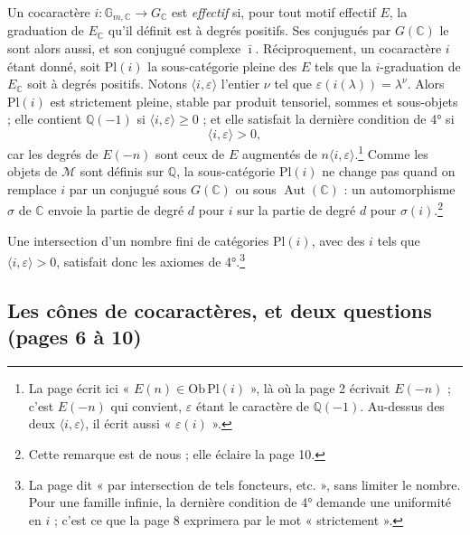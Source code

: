 \documentclass[11pt,a4paper]{article}
\begin{document}
Un cocaractère $i \colon \mathbb{G}_{m,\mathbb{C}} \to G_{\mathbb{C}}$ est
\emph{effectif} si, pour tout motif effectif $E$, la graduation de
$E_{\mathbb{C}}$ qu'il définit est à degrés positifs. Ses conjugués par
$G(\mathbb{C})$ le sont alors aussi, et son conjugué complexe $\bar{\imath}$.
Réciproquement, un cocaractère $i$ étant donné, soit $\mathrm{Pl}(i)$ la
sous-catégorie pleine des $E$ tels que la $i$-graduation de $E_{\mathbb{C}}$
soit à degrés positifs. Notons $\langle i, \varepsilon\rangle$ l'entier $\nu$
tel que $\varepsilon(i(\lambda)) = \lambda^{\nu}$. Alors $\mathrm{Pl}(i)$ est
strictement pleine, stable par produit tensoriel, sommes et sous-objets ; elle
contient $\mathbb{Q}(-1)$ si $\langle i, \varepsilon\rangle \geqslant 0$ ; et
elle satisfait la dernière condition de 4° si
\[
\langle i, \varepsilon\rangle > 0 ,
\]
car les degrés de $E(-n)$ sont ceux de $E$ augmentés de $n\langle i,
\varepsilon\rangle$.\footnote{La page écrit ici « $E(n) \in
\mathrm{Ob}\,\mathrm{Pl}(i)$ », là où la page 2 écrivait $E(-n)$ ; c'est $E(-n)$
qui convient, $\varepsilon$ étant le caractère de $\mathbb{Q}(-1)$. Au-dessus
des deux $\langle i, \varepsilon\rangle$, il écrit aussi « $\varepsilon(i)$ ».}
Comme les objets de $\mathcal{M}$ sont définis sur $\mathbb{Q}$, la
sous-catégorie $\mathrm{Pl}(i)$ ne change pas quand on remplace $i$ par un
conjugué sous $G(\mathbb{C})$ ou sous $\operatorname{Aut}(\mathbb{C})$ : un
automorphisme $\sigma$ de $\mathbb{C}$ envoie la partie de degré $d$ pour $i$
sur la partie de degré $d$ pour $\sigma(i)$.\footnote{Cette remarque est de
nous ; elle éclaire la page 10.}

Une intersection d'un nombre fini de catégories $\mathrm{Pl}(i)$, avec des $i$
tels que $\langle i, \varepsilon\rangle > 0$, satisfait donc les axiomes de
4°.\footnote{La page dit « par intersection de tels foncteurs, etc. », sans
limiter le nombre. Pour une famille infinie, la dernière condition de 4°
demande une uniformité en $i$ ; c'est ce que la page 8 exprimera par le mot
« strictement ».}

\subsection*{Les cônes de cocaractères, et deux questions (pages 6 à 10)}
\end{document}
